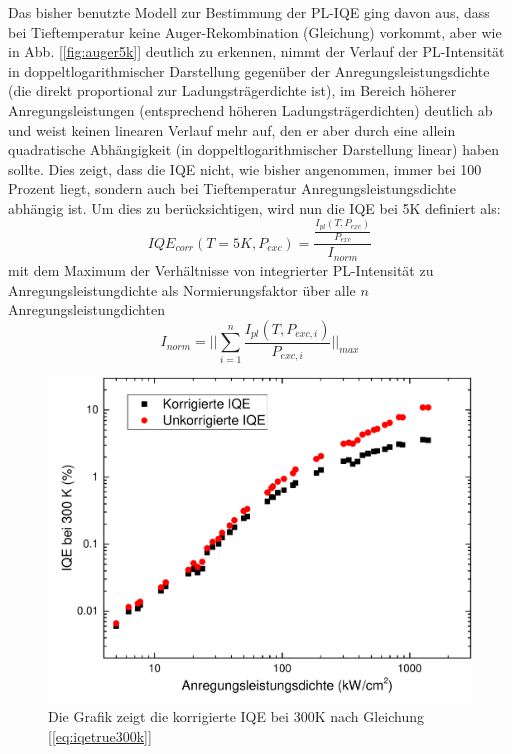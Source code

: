 \vspace{0.1cm}
\raggedright
Das bisher benutzte Modell zur Bestimmung der PL-IQE ging davon aus, dass bei Tieftemperatur keine Auger-Rekombination (Gleichung) vorkommt, aber wie in Abb. [\ref{fig:auger5k}] deutlich zu erkennen, nimmt der Verlauf der PL-Intensität in doppeltlogarithmischer Darstellung gegenüber der Anregungsleistungsdichte (die direkt proportional zur Ladungsträgerdichte ist), im Bereich höherer Anregungsleistungen (entsprechend höheren Ladungsträgerdichten) deutlich ab und weist keinen linearen Verlauf mehr auf, den er aber durch eine allein quadratische Abhängigkeit (in doppeltlogarithmischer Darstellung linear) haben sollte. Dies zeigt, dass die IQE nicht, wie bisher angenommen, immer bei 100 Prozent liegt, sondern auch bei Tieftemperatur Anregungsleistungsdichte abhängig ist. Um dies zu berücksichtigen, wird nun die IQE bei 5K definiert als:
%
\begin{equation}
    IQE_{corr}(T = 5K, P_{exc}) = \frac{ \frac{I_{pl}(T,P_{exc}) }{P_{exc} } } { I_{norm}}
    \label{eq:iqetrue5k}
\end{equation}
%
mit dem Maximum der Verhältnisse von integrierter PL-Intensität zu Anregungsleistungdichte als  Normierungsfaktor über alle $n$ Anregungsleistungdichten
\begin{equation}
    I_{norm} = \lvert \lvert \sum_{i=1}^{n} \frac{I_{pl}(T,P_{exc,i})}{P_{exc,i}} \lvert \lvert_{max}
    \label{eq:iplnorm}
\end{equation}
%
\begin{figure}[htb]
\centering
    \begin{minipage}[t]{0.49\linewidth}
        \includegraphics[width=\linewidth]{Bilder/KorrigierteIQE300K.pdf}
        \caption{Die Grafik zeigt die korrigierte IQE bei 300K nach Gleichung [\ref{eq:iqetrue300k}] }
        \label{fig:trueiqe300k}
    \end{minipage}
\end{figure}
